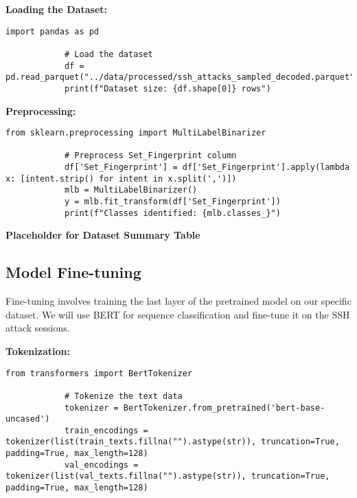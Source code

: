         \vspace{1em}

        \textbf{Loading the Dataset:}

        \begin{lstlisting}[caption={Load dataset and print its size}, label={lst:load_dataset}]
            import pandas as pd

            # Load the dataset
            df = pd.read_parquet("../data/processed/ssh_attacks_sampled_decoded.parquet")
            print(f"Dataset size: {df.shape[0]} rows")
        \end{lstlisting}
        
        \vspace{1em}

        \textbf{Preprocessing:}

        \begin{lstlisting}[caption={Preprocess `Set\_Fingerprint` column}, label={lst:preprocess-fingerprint}]
            from sklearn.preprocessing import MultiLabelBinarizer

            # Preprocess Set_Fingerprint column
            df['Set_Fingerprint'] = df['Set_Fingerprint'].apply(lambda x: [intent.strip() for intent in x.split(',')])
            mlb = MultiLabelBinarizer()
            y = mlb.fit_transform(df['Set_Fingerprint'])
            print(f"Classes identified: {mlb.classes_}")
        \end{lstlisting}
        
        \vspace{1em}

        \textbf{Placeholder for Dataset Summary Table}
        
    \subsection{Model Fine-tuning}
    
        Fine-tuning involves training the last layer of the pretrained model on our specific dataset. We will use BERT for sequence classification and fine-tune it on the SSH attack sessions.

        \textbf{Tokenization:}

        \begin{lstlisting}[caption={Tokenize text data using BERT tokenizer}, label={lst:bert_tokenizer}]
            from transformers import BertTokenizer

            # Tokenize the text data
            tokenizer = BertTokenizer.from_pretrained('bert-base-uncased')
            train_encodings = tokenizer(list(train_texts.fillna("").astype(str)), truncation=True, padding=True, max_length=128)
            val_encodings = tokenizer(list(val_texts.fillna("").astype(str)), truncation=True, padding=True, max_length=128)
        \end{lstlisting}
        
